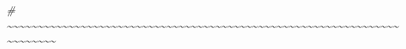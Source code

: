 \documentclass[
]{article}
\newenvironment{Shaded}{\begin{snugshade}}{\end{snugshade}}
\newcommand{\CommentTok}[1]{\textcolor[rgb]{0.56,0.35,0.01}{\textit{#1}}}
\begin{document}
\begin{Shaded}
\begin{Highlighting}[]
\CommentTok{\#     \textasciitilde{}\textasciitilde{}\textasciitilde{}\textasciitilde{}\textasciitilde{}\textasciitilde{}\textasciitilde{}\textasciitilde{}\textasciitilde{}\textasciitilde{}\textasciitilde{}\textasciitilde{}\textasciitilde{}\textasciitilde{}\textasciitilde{}\textasciitilde{}\textasciitilde{}\textasciitilde{}\textasciitilde{}\textasciitilde{}\textasciitilde{}\textasciitilde{}\textasciitilde{}\textasciitilde{}\textasciitilde{}\textasciitilde{}\textasciitilde{}\textasciitilde{}\textasciitilde{}\textasciitilde{}\textasciitilde{}\textasciitilde{}\textasciitilde{}\textasciitilde{}\textasciitilde{}\textasciitilde{}\textasciitilde{}\textasciitilde{}\textasciitilde{}\textasciitilde{}\textasciitilde{}\textasciitilde{}\textasciitilde{}\textasciitilde{}\textasciitilde{}\textasciitilde{}\textasciitilde{}\textasciitilde{}\textasciitilde{}\textasciitilde{}\textasciitilde{}\textasciitilde{}\textasciitilde{}\textasciitilde{}\textasciitilde{}\textasciitilde{}\textasciitilde{}\textasciitilde{}\textasciitilde{}\textasciitilde{}\textasciitilde{}\textasciitilde{}\textasciitilde{}\textasciitilde{}\textasciitilde{}\textasciitilde{}\textasciitilde{}\textasciitilde{}\textasciitilde{}\textasciitilde{}\textasciitilde{}\textasciitilde{}}


\end{Highlighting}
\end{Shaded}
\end{document}
